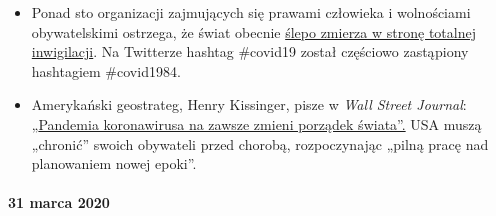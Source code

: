 \begin{itemize}
{  gwałtownie do ponad sześciu milionów} (zobacz wykres), co jest liczbą
  niespotykaną od czasu Wielkiego Kryzysu w 1929 r.
\item
  Ponad sto organizacji zajmujących się prawami człowieka i wolnościami
  obywatelskimi ostrzega, że świat obecnie
  \href{https://www.dailymail.co.uk/news/article-8181381/World-sleepwalking-surveillance-state-rights-groups-warn.html}{ślepo
  zmierza w stronę totalnej inwigilacji}. Na Twitterze hashtag \#covid19
  został częściowo zastąpiony hashtagiem \#covid1984.
\item
  Amerykański geostrateg, Henry Kissinger, pisze w \emph{Wall Street
  Journal}:
  „\href{https://www.wsj.com/articles/the-coronavirus-pandemic-will-forever-alter-the-world-order-11585953005}{Pandemia
  koronawirusa na zawsze zmieni porządek świata''.} USA muszą „chronić''
  swoich obywateli przed chorobą, rozpoczynając „pilną pracę nad
  planowaniem nowej epoki''.
\end{itemize}

\hypertarget{31-marca-2020}{%
\paragraph{31 marca 2020}\label{31-marca-2020}}

